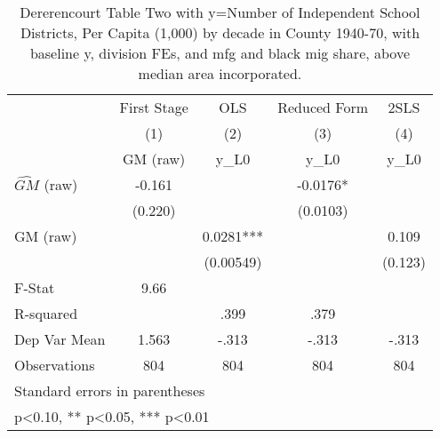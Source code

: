 \begin{table}[htbp]\centering
\def\sym#1{\ifmmode^{#1}\else\(^{#1}\)\fi}
\caption{Dererencourt Table Two with y=Number of Independent School Districts, Per Capita (1,000) by decade in County 1940-70, with baseline y, division FEs, and mfg and black mig share, above median area incorporated.}
\begin{tabular}{l*{4}{c}}
\toprule
                    & First Stage   &         OLS   &Reduced Form   &        2SLS   \\
                    &\multicolumn{1}{c}{(1)}&\multicolumn{1}{c}{(2)}&\multicolumn{1}{c}{(3)}&\multicolumn{1}{c}{(4)}\\
                    &\multicolumn{1}{c}{GM  (raw)}&\multicolumn{1}{c}{y\_L0}&\multicolumn{1}{c}{y\_L0}&\multicolumn{1}{c}{y\_L0}\\
\midrule
$\hat{GM}$ (raw)    &      -0.161   &               &     -0.0176*  &               \\
                    &     (0.220)   &               &    (0.0103)   &               \\
\addlinespace
GM  (raw)           &               &      0.0281***&               &       0.109   \\
                    &               &   (0.00549)   &               &     (0.123)   \\
\midrule
F-Stat              &        9.66   &               &               &               \\
R-squared           &               &        .399   &        .379   &               \\
Dep Var Mean        &       1.563   &       -.313   &       -.313   &       -.313   \\
Observations        &         804   &         804   &         804   &         804   \\
\bottomrule
\multicolumn{5}{l}{\footnotesize Standard errors in parentheses}\\
\multicolumn{5}{l}{\footnotesize * p<0.10, ** p<0.05, *** p<0.01}\\
\end{tabular}
\end{table}
